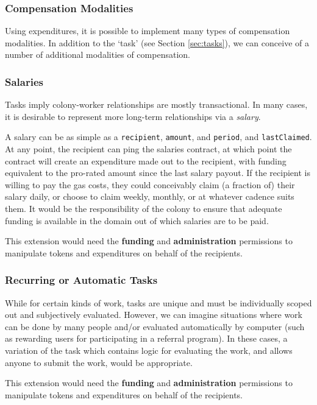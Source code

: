 \subsubsection{Compensation Modalities}\label{sec:salary}

Using expenditures, it is possible to implement many types of compensation modalities. In addition to the `task' (see Section \ref{sec:tasks}), we can conceive of a number of additional modalities of compensation.

\subsubsection*{Salaries}

Tasks imply colony-worker relationships are mostly transactional. In many cases, it is desirable to represent more long-term relationships via a \emph{salary}.

A salary can be as simple as a \texttt{recipient}, \texttt{amount}, and \texttt{period}, and \texttt{lastClaimed}. At any point, the recipient can ping the salaries contract, at which point the contract will create an expenditure made out to the recipient, with funding equivalent to the pro-rated amount since the last salary payout. If the recipient is willing to pay the gas costs, they could conceivably claim (a fraction of) their salary daily, or choose to claim weekly, monthly, or at whatever cadence suits them. It would be the responsibility of the colony to ensure that adequate funding is available in the domain out of which salaries are to be paid.

This extension would need the \textbf{funding} and \textbf{administration} permissions to manipulate tokens and expenditures on behalf of the recipients.

\subsubsection*{Recurring or Automatic Tasks}

While for certain kinds of work, tasks are unique and must be individually scoped out and subjectively evaluated. However, we can imagine situations where work can be done by many people and/or evaluated automatically by computer (such as rewarding users for participating in a referral program). In these cases, a variation of the task which contains logic for evaluating the work, and allows anyone to submit the work, would be appropriate.

This extension would need the \textbf{funding} and \textbf{administration} permissions to manipulate tokens and expenditures on behalf of the recipients.

